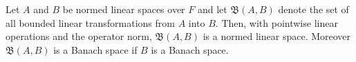 Let $A$ and $B$ be normed linear spaces over $F$ and let $\mathfrak{B}(A, B)$ denote the set of all bounded linear transformations from $A$ into $B$. Then, with pointwise linear operations and the operator norm, $\mathfrak{B}(A, B)$ is a normed linear space. Moreover $\mathfrak{B}(A, B)$ is a Banach space if $B$ is a Banach space.